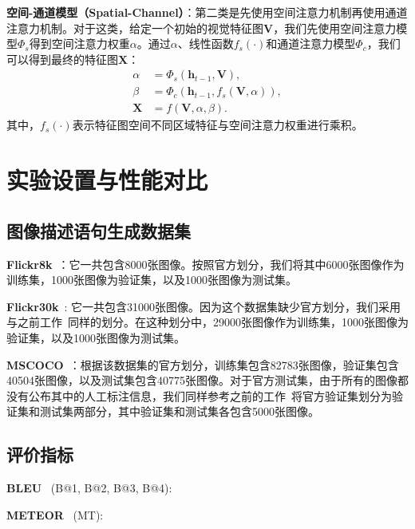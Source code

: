 \textbf{空间-通道模型（Spatial-Channel）}：第二类是先使用空间注意力机制再使用通道注意力机制。对于这类，给定一个初始的视觉特征图$\mathbf{V}$，我们先使用空间注意力模型$\Phi_s$得到空间注意力权重$\alpha$。通过$\alpha$、线性函数$f_s(\cdot)$和通道注意力模型$\Phi_c$，我们可以得到最终的特征图$\mathbf{X}$：
\begin{equation} \label{ch5:eq:eq_9}
\begin{split}
\alpha &= \Phi_s \left(\mathbf{h}_{t-1}, \mathbf{V} \right), \\
\beta &= \Phi_c \left(\mathbf{h}_{t-1}, f_s \left(\mathbf{V}, \alpha \right) \right), \\
\mathbf{X} &= f \left(\mathbf{V}, \alpha, \beta \right).
\end{split}
\end{equation}
其中，$f_s(\cdot)$表示特征图空间不同区域特征与空间注意力权重进行乘积。



\section{实验设置与性能对比}
\subsection{图像描述语句生成数据集}
\noindent\textbf{Flickr8k}~\cite{hodosh2013framing}：它一共包含8000张图像。按照官方划分，我们将其中6000张图像作为训练集，1000张图像为验证集，以及1000张图像为测试集。

\noindent\textbf{Flickr30k}~\cite{young2014image}: 它一共包含31000张图像。因为这个数据集缺少官方划分，我们采用与之前工作~\cite{karpathy2015deep}同样的划分。在这种划分中，29000张图像作为训练集，1000张图像为验证集，以及1000张图像为测试集。

\noindent\textbf{MSCOCO}~\cite{lin2014microsoft}：根据该数据集的官方划分，训练集包含82783张图像，验证集包含40504张图像，以及测试集包含40775张图像。对于官方测试集，由于所有的图像都没有公布其中的人工标注信息，我们同样参考之前的工作~\cite{karpathy2015deep}将官方验证集划分为验证集和测试集两部分，其中验证集和测试集各包含5000张图像。


\subsection{评价指标}
\noindent\textbf{BLEU}~\cite{papineni2002bleu} (B@1, B@2, B@3, B@4):

\noindent\textbf{METEOR}~\cite{banerjee2005meteor} (MT):

